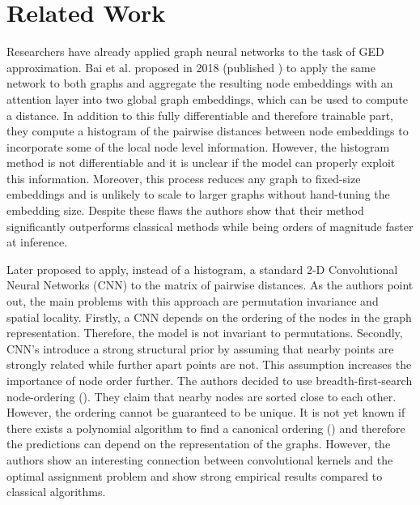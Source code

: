 \section{Related Work}
\label{section:related_work}

Researchers have already applied graph neural networks to the task of GED approximation. Bai et al. proposed in 2018 (published \citealp{bai2019}) to apply the same network to both graphs and aggregate the resulting node embeddings with an attention layer into two global graph embeddings, which can be used to compute a distance. In addition to this fully differentiable and therefore trainable part, they compute a histogram of the pairwise distances between node embeddings to incorporate some of the local node level information. However, the histogram method is not differentiable and it is unclear if the model can properly exploit this information. Moreover, this process reduces any graph to fixed-size embeddings and is unlikely to scale to larger graphs without hand-tuning the embedding size. Despite these flaws the authors show that their method significantly outperforms classical methods while being orders of magnitude faster at inference.

Later \cite{bai2018_cnn1} proposed to apply, instead of a histogram, a standard 2-D Convolutional Neural Networks (CNN) to the matrix of pairwise distances. As the authors point out, the main problems with this approach are permutation invariance and spatial locality. Firstly, a CNN depends on the ordering of the nodes in the graph representation. Therefore, the model is not invariant to permutations. Secondly, CNN's introduce a strong structural prior by assuming that nearby points are strongly related while further apart points are not. This assumption increases the importance of node order further. The authors decided to use breadth-first-search node-ordering (\citealp{bfs2018}). They claim that nearby nodes are sorted close to each other. However, the ordering cannot be guaranteed to be unique. It is not yet known if there exists a polynomial algorithm to find a canonical ordering (\citealp{canonical2016}) and therefore the predictions can depend on the representation of the graphs. However, the authors show an interesting connection between convolutional kernels and the optimal assignment problem and show strong empirical results compared to classical algorithms.

